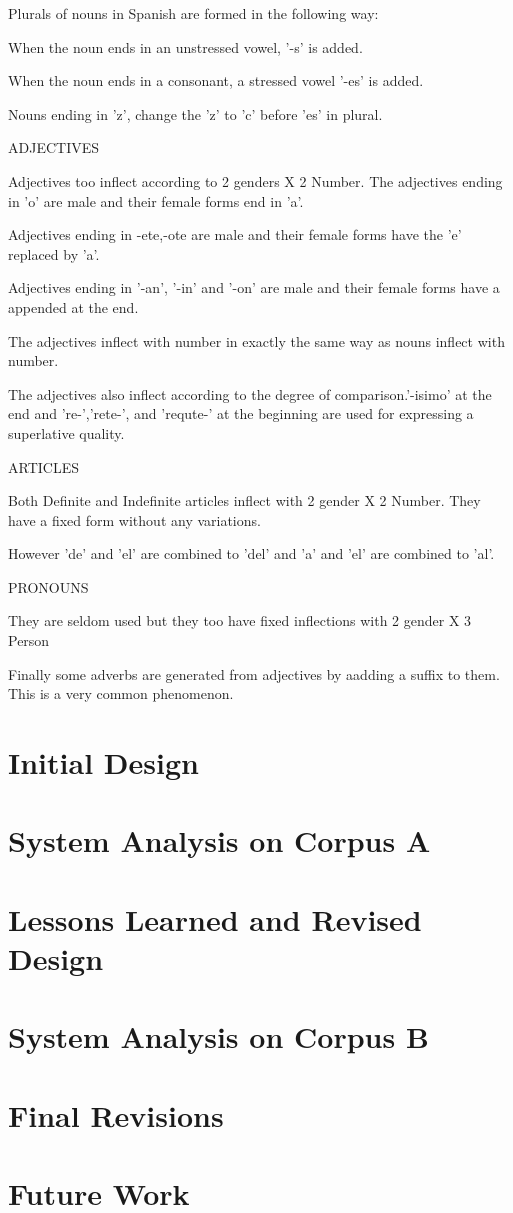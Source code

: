 \documentclass[11pt,letterpaper]{article}
\begin{document}
Plurals of nouns in Spanish  are formed in the following way:

	When the noun ends in an unstressed vowel, '-s' is added.

	When the noun ends in a consonant, a stressed vowel '-es' is added.

Nouns ending in 'z', change the 'z' to 'c' before 'es' in plural.


ADJECTIVES

Adjectives too inflect according to 2 genders X 2 Number. The adjectives ending in 'o' are male and their female forms end in 'a'.

Adjectives ending in -ete,-ote are male and their female forms have the 'e' replaced by 'a'.

Adjectives ending in '-an', '-in' and '-on' are male and their female forms have a appended at the end.

The adjectives inflect with number in exactly the same way as nouns inflect with number.

The adjectives also inflect according to the degree of comparison.'-isimo' at the end and 're-','rete-', and 'requte-' at the beginning are used for expressing a superlative quality.


ARTICLES

Both Definite and Indefinite articles inflect with 2 gender X 2 Number. They have a fixed form without any variations.

However 'de' and 'el' are combined to 'del' and 'a' and 'el' are combined to 'al'.

PRONOUNS

They are seldom used but they too have fixed inflections with 2 gender X 3 Person

Finally some adverbs are generated from adjectives by aadding a suffix to them. This is a very common phenomenon.  
\section{Initial Design}

\section{System Analysis on Corpus A}

\section{Lessons Learned and Revised Design}

\section{System Analysis on Corpus B}

\section{Final Revisions}

\section{Future Work}







\label{lastpage}
\end{document}
